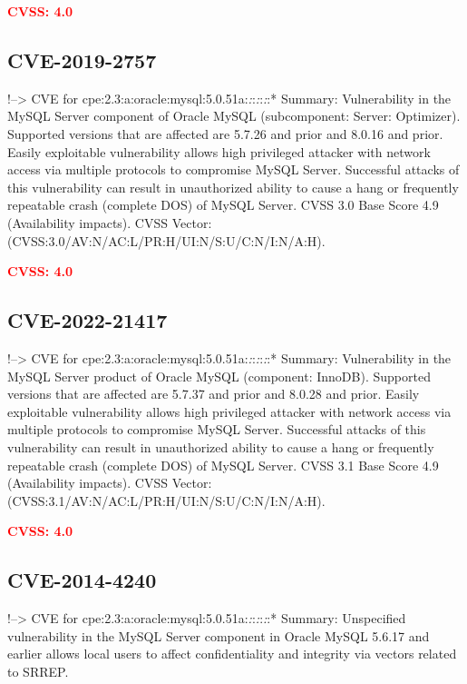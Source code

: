 \documentclass[a4paper, 12pt]{article}
\begin{document}
\textbf{\textcolor{red}{CVSS: 4.0}}

\hypertarget{cve-2019-2757}{%
\subsection{CVE-2019-2757}\label{cve-2019-2757}}

!--\textgreater{} CVE for
cpe:2.3:a:oracle:mysql:5.0.51a:\emph{:}:\emph{:}:\emph{:}:* Summary:
Vulnerability in the MySQL Server component of Oracle MySQL
(subcomponent: Server: Optimizer). Supported versions that are affected
are 5.7.26 and prior and 8.0.16 and prior. Easily exploitable
vulnerability allows high privileged attacker with network access via
multiple protocols to compromise MySQL Server. Successful attacks of
this vulnerability can result in unauthorized ability to cause a hang or
frequently repeatable crash (complete DOS) of MySQL Server. CVSS 3.0
Base Score 4.9 (Availability impacts). CVSS Vector:
(CVSS:3.0/AV:N/AC:L/PR:H/UI:N/S:U/C:N/I:N/A:H).

\textbf{\textcolor{red}{CVSS: 4.0}}

\hypertarget{cve-2022-21417}{%
\subsection{CVE-2022-21417}\label{cve-2022-21417}}

!--\textgreater{} CVE for
cpe:2.3:a:oracle:mysql:5.0.51a:\emph{:}:\emph{:}:\emph{:}:* Summary:
Vulnerability in the MySQL Server product of Oracle MySQL (component:
InnoDB). Supported versions that are affected are 5.7.37 and prior and
8.0.28 and prior. Easily exploitable vulnerability allows high
privileged attacker with network access via multiple protocols to
compromise MySQL Server. Successful attacks of this vulnerability can
result in unauthorized ability to cause a hang or frequently repeatable
crash (complete DOS) of MySQL Server. CVSS 3.1 Base Score 4.9
(Availability impacts). CVSS Vector:
(CVSS:3.1/AV:N/AC:L/PR:H/UI:N/S:U/C:N/I:N/A:H).

\textbf{\textcolor{red}{CVSS: 4.0}}

\hypertarget{cve-2014-4240}{%
\subsection{CVE-2014-4240}\label{cve-2014-4240}}

!--\textgreater{} CVE for
cpe:2.3:a:oracle:mysql:5.0.51a:\emph{:}:\emph{:}:\emph{:}:* Summary:
Unspecified vulnerability in the MySQL Server component in Oracle MySQL
5.6.17 and earlier allows local users to affect confidentiality and
integrity via vectors related to SRREP.
\end{document}
